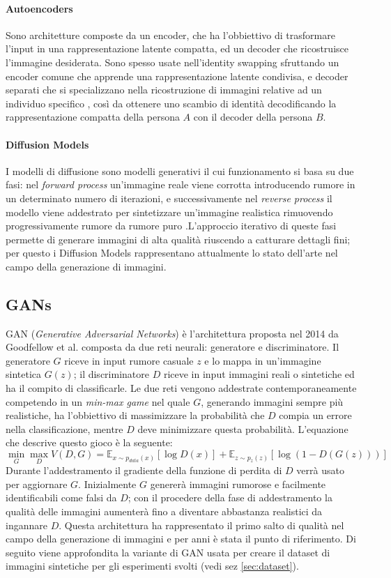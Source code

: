 \paragraph{Autoencoders} Sono architetture composte da un encoder, che ha l'obbiettivo di trasformare l'input in una rappresentazione latente compatta, ed un decoder che ricostruisce l'immagine desiderata. Sono spesso usate nell'identity swapping sfruttando un encoder comune che apprende una rappresentazione latente condivisa, e decoder separati che si specializzano nella ricostruzione di immagini relative ad un individuo specifico \cite{fernando2025face}, così da ottenere uno scambio di identità decodificando la rappresentazione compatta della persona $A$ con il decoder della persona $B$.
\paragraph{Diffusion Models} I modelli di diffusione sono modelli generativi il cui funzionamento si basa su due fasi: nel \textit{forward process} un'immagine reale viene corrotta introducendo rumore in un determinato numero di iterazioni, e successivamente nel \textit{reverse process} il modello viene addestrato per sintetizzare un'immagine realistica rimuovendo progressivamente rumore da rumore puro \cite{ho2020denoising}.L'approccio iterativo di queste fasi permette di generare immagini di alta qualità riuscendo a catturare dettagli fini; per questo i Diffusion Models  rappresentano attualmente lo stato dell'arte nel campo della generazione di immagini.
\subsection{GANs}\label{subsec:GAN}
GAN (\textit{Generative Adversarial Networks}) è l'architettura proposta nel 2014 da Goodfellow et al. \cite{goodfellow2014generative} composta da due reti neurali: generatore e discriminatore. Il generatore $G$ riceve in input rumore casuale $z$ e lo mappa in un'immagine sintetica $G(z)$; il discriminatore $D$ riceve in input immagini reali o sintetiche ed ha il compito di classificarle.
Le due reti vengono addestrate contemporaneamente competendo in un \textit{min-max game} nel quale $G$, generando immagini sempre più realistiche, ha l'obbiettivo di massimizzare la probabilità che $D$ compia un errore nella classificazione, mentre $D$ deve minimizzare questa probabilità. L'equazione che descrive questo gioco è la seguente:
\begin{equation}
\min_G \max_D V(D,G) = \mathbb{E}_{x \sim p_{data}(x)} [\log D(x)] + \mathbb{E}_{z \sim p_z(z)} [\log(1 - D(G(z)))]
\end{equation}\label{eq:gan}
Durante l'addestramento il gradiente della funzione di perdita di $D$ verrà usato per aggiornare $G$. Inizialmente $G$ genererà immagini rumorose e facilmente identificabili come falsi da $D$; con il procedere della fase di addestramento la qualità delle immagini aumenterà fino a diventare abbastanza realistici da ingannare $D$.
Questa architettura ha rappresentato il primo salto di qualità nel campo della generazione di immagini e per anni è stata  il punto di riferimento.
Di seguito viene approfondita la variante di GAN usata per creare il dataset di immagini sintetiche per gli esperimenti svolti (vedi sez \ref{sec:dataset}).
